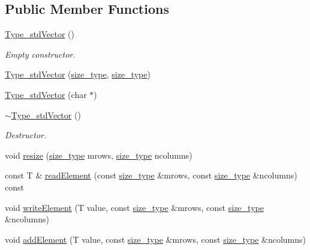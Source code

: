 \subsection*{Public Member Functions}
\begin{DoxyCompactItemize}
\item 
\hyperlink{classlmx_1_1Type__stdVector_a39dd4cbb3292f5319a8915ccf56598e9}{Type\-\_\-std\-Vector} ()
\begin{DoxyCompactList}\small\item\em Empty constructor. \end{DoxyCompactList}\item 
\hyperlink{classlmx_1_1Type__stdVector_a74cd5d86073824fc5bd9e7d1b52eeaa7}{Type\-\_\-std\-Vector} (\hyperlink{lmx__mat__data_8h_a49b489a408a211a90e766329c0732d7b}{size\-\_\-type}, \hyperlink{lmx__mat__data_8h_a49b489a408a211a90e766329c0732d7b}{size\-\_\-type})
\item 
\hyperlink{classlmx_1_1Type__stdVector_a8ac268697637315c95a3c39ec482c2ad}{Type\-\_\-std\-Vector} (char $\ast$)
\item 
\hyperlink{classlmx_1_1Type__stdVector_ae78b26a36d536162d1ba8ea634850d23}{$\sim$\-Type\-\_\-std\-Vector} ()
\begin{DoxyCompactList}\small\item\em Destructor. \end{DoxyCompactList}\item 
void \hyperlink{classlmx_1_1Type__stdVector_a727c040e4adaf13abc799c4fcef971b4}{resize} (\hyperlink{lmx__mat__data_8h_a49b489a408a211a90e766329c0732d7b}{size\-\_\-type} mrows, \hyperlink{lmx__mat__data_8h_a49b489a408a211a90e766329c0732d7b}{size\-\_\-type} ncolumns)
\item 
const T \& \hyperlink{classlmx_1_1Type__stdVector_a9bd94cc0b965732f66f0f55d72b7cd06}{read\-Element} (const \hyperlink{lmx__mat__data_8h_a49b489a408a211a90e766329c0732d7b}{size\-\_\-type} \&mrows, const \hyperlink{lmx__mat__data_8h_a49b489a408a211a90e766329c0732d7b}{size\-\_\-type} \&ncolumns) const 
\item 
void \hyperlink{classlmx_1_1Type__stdVector_a70b59a584946a3bf78a3bf93e33521f4}{write\-Element} (T value, const \hyperlink{lmx__mat__data_8h_a49b489a408a211a90e766329c0732d7b}{size\-\_\-type} \&mrows, const \hyperlink{lmx__mat__data_8h_a49b489a408a211a90e766329c0732d7b}{size\-\_\-type} \&ncolumns)
\item 
void \hyperlink{classlmx_1_1Type__stdVector_ab5efd225785a7c2d358762c3a41044d1}{add\-Element} (T value, const \hyperlink{lmx__mat__data_8h_a49b489a408a211a90e766329c0732d7b}{size\-\_\-type} \&mrows, const \hyperlink{lmx__mat__data_8h_a49b489a408a211a90e766329c0732d7b}{size\-\_\-type} \&ncolumns)

\end{DoxyCompactItemize}
